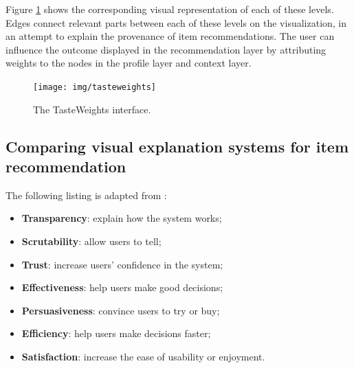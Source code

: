 Figure \ref{figure:tasteweights} shows the corresponding visual representation of each of these levels. Edges connect relevant parts between each of these levels on the visualization, in an attempt to explain the provenance of item recommendations. The user can influence the outcome displayed in the recommendation layer by attributing weights to the nodes in the profile layer and context layer\cite{bostandjiev:2012}.

\begin{figure}%
	\begin{center}
		\texttt{[image: img/tasteweights]}%
	\end{center}
	\caption{The TasteWeights interface.}%
	\label{figure:tasteweights}%
\end{figure}








\subsection{Comparing visual explanation systems for item recommendation}



The following listing is adapted from \cite{tintarev:2007:SER:1547550.1547664}:

\begin{itemize}
	\item \textbf{Transparency}: explain how the system works;
	\item \textbf{Scrutability}: allow users to tell;
	\item \textbf{Trust}: increase users' confidence in the system;
	\item \textbf{Effectiveness}: help users make good decisions;
	\item \textbf{Persuasiveness}: convince users to try or buy;
	\item \textbf{Efficiency}: help users make decisions faster;
	\item \textbf{Satisfaction}: increase the ease of usability or enjoyment.
\end{itemize}

